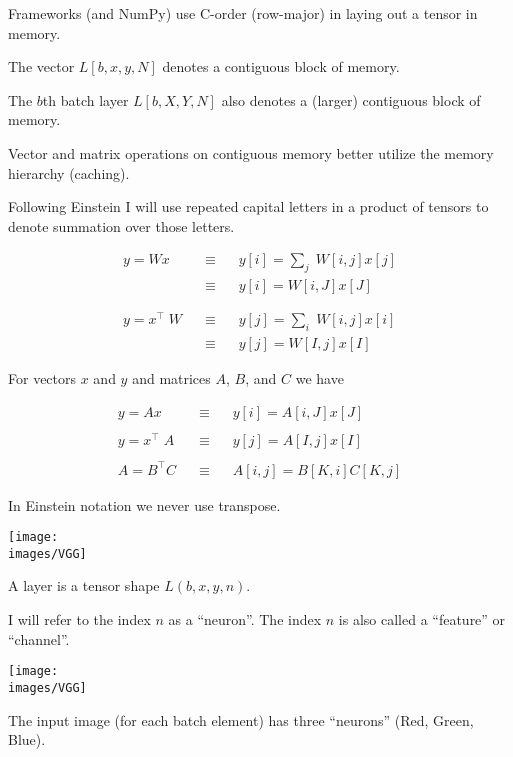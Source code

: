 {

Frameworks (and NumPy) use C-order (row-major) in laying out a tensor in memory.

\vfill
The vector $L[b,x,y,N]$ denotes a contiguous block of memory.

\vfill
The $b$th batch layer $L[b,X,Y,N]$ also denotes a (larger) contiguous block of memory.

\vfill
Vector and matrix operations on contiguous memory better utilize the memory hierarchy (caching).

Following Einstein I will use repeated capital letters in a product of tensors to denote summation over those letters.

\vfill
\begin{eqnarray*}
y = Wx &\;\;\;\equiv\;\;\; & y[i] = \sum_j \;W[i,j]x[j] \\
& \;\;\;\equiv \;\;\; & y[i] = W[i,J]x[J] \\
\\
\\
y = x^\top\;W & \;\;\;\equiv \;\;\; & y[j] = \sum_i \;W[i,j]x[i] \\
& \;\;\;\equiv \;\;\; & y[j] = W[I,j]x[I]
\end{eqnarray*}


\vfill
For vectors $x$ and $y$ and matrices $A$, $B$, and $C$ we have

\begin{eqnarray*}
y = Ax &\;\;\;\equiv\;\;\; & y[i] = A[i,J]x[J] \\
\\
y = x^\top\;A & \;\;\;\equiv \;\;\; & y[j] = A[I,j]x[I] \\
\\
A = B^\top C & \;\;\; \equiv \;\;\; & A[i,j] = B[K,i]C[K,j]
\end{eqnarray*}

\vfill
In Einstein notation we never use transpose.

\vfill
\centerline{\texttt{[image: \\images/VGG]}}

\vfill
A layer is a tensor shape $L(b,x,y,n)$.

\vfill
I will refer to the index $n$ as a ``neuron''. The index $n$ is also called
a ``feature'' or ``channel''.

\vfill
\centerline{\texttt{[image: \\images/VGG]}}

\vfill
The input image (for each batch element) has three ``neurons'' (Red, Green, Blue).

}
